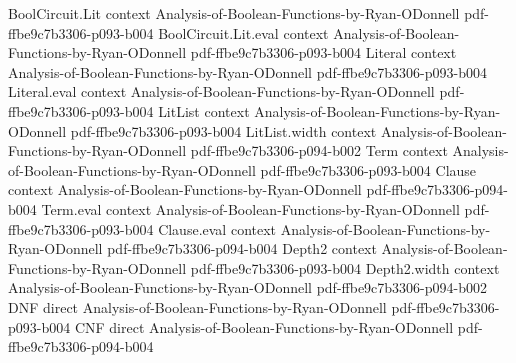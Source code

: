 \begin{theorem}
\leanok
{}
\proofstep
  {BoolCircuit.Lit}
  {context}
  {Analysis-of-Boolean-Functions-by-Ryan-ODonnell}
  {pdf-ffbe9c7b3306-p093-b004}
\proofstep
  {BoolCircuit.Lit.eval}
  {context}
  {Analysis-of-Boolean-Functions-by-Ryan-ODonnell}
  {pdf-ffbe9c7b3306-p093-b004}
\proofstep
  {Literal}
  {context}
  {Analysis-of-Boolean-Functions-by-Ryan-ODonnell}
  {pdf-ffbe9c7b3306-p093-b004}
\proofstep
  {Literal.eval}
  {context}
  {Analysis-of-Boolean-Functions-by-Ryan-ODonnell}
  {pdf-ffbe9c7b3306-p093-b004}
\proofstep
  {LitList}
  {context}
  {Analysis-of-Boolean-Functions-by-Ryan-ODonnell}
  {pdf-ffbe9c7b3306-p093-b004}
\proofstep
  {LitList.width}
  {context}
  {Analysis-of-Boolean-Functions-by-Ryan-ODonnell}
  {pdf-ffbe9c7b3306-p094-b002}
\proofstep
  {Term}
  {context}
  {Analysis-of-Boolean-Functions-by-Ryan-ODonnell}
  {pdf-ffbe9c7b3306-p093-b004}
\proofstep
  {Clause}
  {context}
  {Analysis-of-Boolean-Functions-by-Ryan-ODonnell}
  {pdf-ffbe9c7b3306-p094-b004}
\proofstep
  {Term.eval}
  {context}
  {Analysis-of-Boolean-Functions-by-Ryan-ODonnell}
  {pdf-ffbe9c7b3306-p093-b004}
\proofstep
  {Clause.eval}
  {context}
  {Analysis-of-Boolean-Functions-by-Ryan-ODonnell}
  {pdf-ffbe9c7b3306-p094-b004}
\proofstep
  {Depth2}
  {context}
  {Analysis-of-Boolean-Functions-by-Ryan-ODonnell}
  {pdf-ffbe9c7b3306-p093-b004}
\proofstep
  {Depth2.width}
  {context}
  {Analysis-of-Boolean-Functions-by-Ryan-ODonnell}
  {pdf-ffbe9c7b3306-p094-b002}
\proofstep
  {DNF}
  {direct}
  {Analysis-of-Boolean-Functions-by-Ryan-ODonnell}
  {pdf-ffbe9c7b3306-p093-b004}
\proofstep
  {CNF}
  {direct}
  {Analysis-of-Boolean-Functions-by-Ryan-ODonnell}
  {pdf-ffbe9c7b3306-p094-b004}

\end{theorem}
